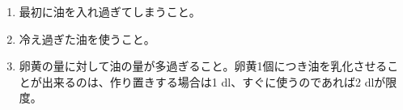 \begin{recette}
\begin{enumerate}
  \begin{enumerate}
  \def\labelenumii{\arabic{enumii}.}
  \item
    最初に油を入れ過ぎてしまうこと。
  \item
    冷え過ぎた油を使うこと。
  \item
    卵黄の量に対して油の量が多過ぎること。卵黄1個につき油を乳化させることが出来るのは、作り置きする場合は1\troisquarts{}
    dl、すぐに使うのであれば2 dlが限度。
  \end{enumerate}
\end{enumerate}
\end{recette}